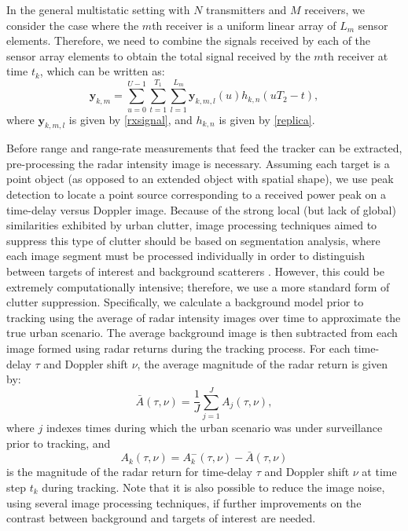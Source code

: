 \documentclass[times]{asjcauth}
\begin{document}
In the general multistatic setting with $N$ transmitters and $M$ receivers, we consider the case where the $m$th receiver is a uniform linear array of $L_{m}$ sensor elements. Therefore, we need to combine the signals received by each of the sensor array elements to obtain the total signal received by the $m$th receiver at time $t_{k}$, which can be written as:
\begin{equation}
\mathbf{y}_{k,m} =\sum_{u=0}^{U-1}\sum_{t=1}^{T_{1}}\sum_{l=1}^{L_{m}}\mathbf{y}_{k,m,l}(u)h_{k,n}\left(uT_{2}-t\right),
\end{equation}
\noindent where $\mathbf{y}_{k,m,l}$ is given by \eqref{rxsignal}, and $h_{k,n}$ is given by \eqref{replica}.

Before range and range-rate measurements that feed the tracker can be extracted, pre-processing the radar intensity image is necessary. Assuming each target is a point object (as opposed to an extended object with spatial shape), we use peak detection to locate a point source corresponding to a received power peak on a time-delay versus Doppler image. Because of the strong local (but lack of global) similarities exhibited by urban clutter, image processing techniques aimed to suppress this type of clutter should be based on segmentation analysis, where each image segment must be processed individually in order to distinguish between targets of interest and background scatterers \cite{segmentation}. However, this could be extremely computationally intensive; therefore, we use a more standard form of clutter suppression. Specifically, we calculate a background model prior to tracking using the average of radar intensity images over time to approximate the true urban scenario. The average background image is then subtracted from each image formed using radar returns during the tracking process. For each time-delay $\tau$ and Doppler shift $\nu$, the average magnitude of the radar return is given by:
\begin{equation*}
\bar{A}(\tau,\nu) = \frac{1}{J}\sum_{j=1}^{J}A_{j}(\tau,\nu),
\end{equation*}
\noindent where $j$ indexes times during which the urban scenario was under surveillance prior to tracking, and
\begin{equation*}
A_{k}(\tau,\nu) = A_{k}^{-}(\tau,\nu) - \bar{A}(\tau,\nu)
\end{equation*}
\noindent is the magnitude of the radar return for time-delay $\tau$ and Doppler shift $\nu$ at time step $t_{k}$ during tracking. Note that it is also possible to reduce the image noise, using several image processing techniques, if further improvements on the contrast between background and targets of interest are needed.
\end{document}
